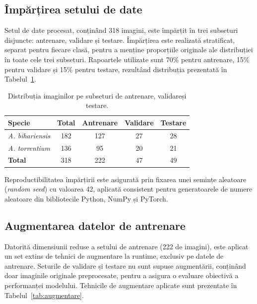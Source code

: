 \subsection{Împărțirea setului de date}

Setul de date procesat, conținând 318 imagini, este împărțit în trei subseturi disjuncte: antrenare, validare și testare. Împărțirea este realizată stratificat, separat pentru fiecare clasă, pentru a menține proporțiile originale ale distribuției în toate cele trei subseturi. Rapoartele utilizate sunt 70\% pentru antrenare, 15\% pentru validare și 15\% pentru testare, rezultând distribuția prezentată în Tabelul~\ref{tab:split}.

\begin{table}[H]
\centering
\caption{Distribuția imaginilor pe subseturi de antrenare, validareși testare.}
\label{tab:split}
\begin{tabular}{lcccc}
\hline
\textbf{Specie} & \textbf{Total} & \textbf{Antrenare} &
\textbf{Validare} & \textbf{Testare} \\
\hline
\textit{A. bihariensis} & 182 & 127 & 27 & 28 \\
\textit{A. torrentium}  & 136 & 95  & 20 & 21 \\
\hline
\textbf{Total}          & 318 & 222 & 47 & 49 \\
\hline
\end{tabular}
\end{table}

Reproductibilitatea împărțirii este asigurată prin fixarea unei semințe aleatoare (\textit{random seed}) cu valoarea 42, aplicată consistent pentru generatoarele de numere aleatoare din bibliotecile Python, NumPy și PyTorch.

\subsection{Augmentarea datelor de antrenare}

Datorită dimensiunii reduse a setului de antrenare (222 de imagini), este aplicat un set extins de tehnici de augmentare la runtime, exclusiv pe datele de antrenare. Seturile de validare și testare nu sunt supuse augmentării, conținând doar imaginile originale preprocesate, pentru a asigura o evaluare obiectivă a performanței modelului. Tehnicile de augmentare aplicate sunt prezentate în Tabelul~\ref{tab:augmentare}.

